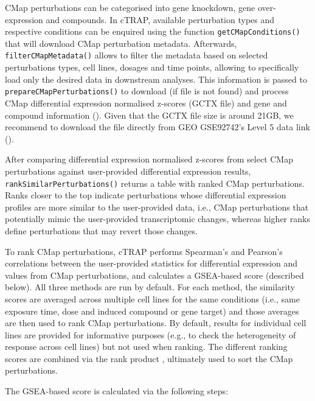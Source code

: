 CMap perturbations can be categorised into gene knockdown, gene over-expression and compounds. In cTRAP, available perturbation types and respective conditions can be enquired using the function \texttt{getCMapConditions()} that will download CMap perturbation metadata. Afterwards, \texttt{filterCMapMetadata()} allows to filter the metadata based on selected perturbations types, cell lines, dosages and time points, allowing to specifically load only the desired data in downstream analyses. This information is passed to \texttt{prepareCMapPerturbations()} to download (if file is not found) and process CMap differential expression normalised z-scores (GCTX file) and gene and compound information (). Given that the GCTX file size is around 21GB, we recommend to download the file directly from GEO GSE92742’s Level 5 data link ().

After comparing differential expression normalised z-scores from select CMap perturbations against user-provided differential expression results, \texttt{rankSimilarPerturbations()} returns a table with ranked CMap perturbations. Ranks closer to the top indicate perturbations whose differential expression profiles are more similar to the user-provided data, i.e., CMap perturbations that potentially mimic the user-provided transcriptomic changes, whereas higher ranks define perturbations that may revert those changes.

To rank CMap perturbations, cTRAP performs Spearman's and Pearson's correlations between the user-provided statistics for differential expression and values from CMap perturbations, and calculates a GSEA-based score (described below). All three methods are run by default. For each method, the similarity scores are averaged across multiple cell lines for the same conditions (i.e., same exposure time, dose and induced compound or gene target) and those averages are then used to rank CMap perturbations. By default, results for individual cell lines are provided for informative purposes (e.g., to check the heterogeneity of response across cell lines) but not used when ranking. The different ranking scores are combined via the rank product \cite{breitling:2004aa}, ultimately used to sort the CMap perturbations. %

The GSEA-based score is calculated via the following steps:

